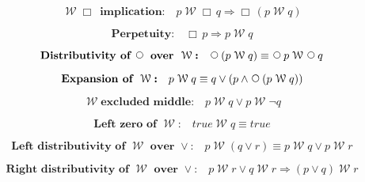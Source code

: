 \documentclass[12pt, fleqn, leqno]{article}
\newcommand{\impl}{\ensuremath{\Rightarrow}}        %
\newcommand{\Wait}{\;\mathcal{W}\;}
\newcommand{\Next}{\;\,\text{\raisebox{3.5pt}{\circle{6}}}}
\newcommand{\Always}{\Box\,}
\newcommand{\spacer}{\vspace{-30pt}}
\begin{document}
\spacer

\begin{equation}\label{E:alwaysWaitImpl}
\textbf{$\Wait\Always$ implication:}\quad p\Wait\Always q \impl\Always (p \Wait q)
\end{equation}

\spacer

\begin{equation}\label{E:alwaysImpWait}
\textbf{Perpetuity:}\quad \Always p \impl p \Wait q
\end{equation}

\spacer

\begin{equation}\label{E:waitNextDist}
\textbf{Distributivity of $\Next$ over $\Wait$:}\quad \Next (p \Wait q) \equiv \Next p \Wait \Next q
\end{equation}

\spacer

\begin{equation}\label{E:expansionWait}
\textbf{Expansion of $\Wait$:}\quad p \Wait q \equiv q \lor (p \land \Next (p \Wait q))
\end{equation}

\spacer

\begin{equation}\label{E:waitExcludedMiddle}
\Wait \textbf{excluded middle:}\quad p \Wait q \lor p\Wait \neg q
\end{equation}

\spacer

\begin{equation}\label{E:leftZeroWait}
\textbf{Left zero of $\Wait$:}\quad true \Wait q \equiv true
\end{equation}

\spacer

\begin{equation}\label{E:waitOrDist}
\textbf{Left distributivity of $\Wait$ over $\lor$:}\quad p \Wait (q \lor r) \equiv p \Wait q \lor p \Wait r
\end{equation}

\spacer

\begin{equation}\label{E:rightWaitOrDist}
\textbf{Right distributivity of $\Wait$ over $\lor$:}\quad p \Wait r \lor q \Wait r \impl (p \lor q) \Wait r
\end{equation}
\end{document}
